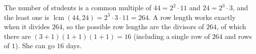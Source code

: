 The number of students is a common multiple of $44=2^2\cdot11$ and $24=2^3\cdot3$, and the least one is $\operatorname{lcm}(44,24)=2^3\cdot3\cdot11=264$. A row length works exactly when it divides $264$, so the possible row lengths are the divisors of $264$, of which there are $(3+1)(1+1)(1+1)=16$ (including a single row of $264$ and rows of $1$). She can go $\boxed{16}$ days.
